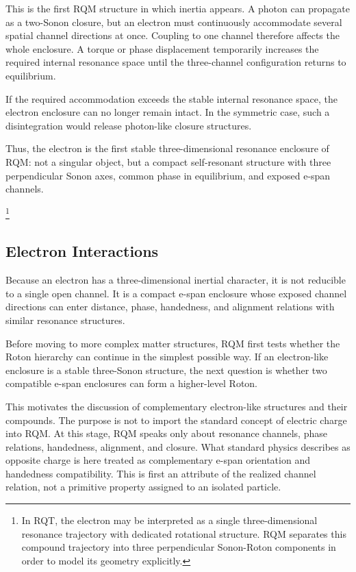 \documentclass[11pt,a4paper]{article}
\begin{document}
This is the first RQM structure in which inertia appears. A photon can propagate as a two-Sonon closure, but an electron must continuously accommodate several spatial channel directions at once. Coupling to one channel therefore affects the whole enclosure. A torque or phase displacement temporarily increases the required internal resonance space until the three-channel configuration returns to equilibrium.

If the required accommodation exceeds the stable internal resonance space, the electron enclosure can no longer remain intact. In the symmetric case, such a disintegration would release photon-like closure structures.

Thus, the electron is the first stable three-dimensional resonance enclosure of RQM: not a singular object, but a compact self-resonant structure with three perpendicular Sonon axes, common phase in equilibrium, and exposed e-span channels.

\footnote{In RQT, the electron may be interpreted as a single three-dimensional resonance trajectory with dedicated rotational structure. RQM separates this compound trajectory into three perpendicular Sonon-Roton components in order to model its geometry explicitly.}




\subsection{Electron Interactions}

Because an electron has a three-dimensional inertial character, it is not reducible to a single open channel. It is a compact e-span enclosure whose exposed channel directions can enter distance, phase, handedness, and alignment relations with similar resonance structures.

Before moving to more complex matter structures, RQM first tests whether the Roton hierarchy can continue in the simplest possible way. If an electron-like enclosure is a stable three-Sonon structure, the next question is whether two compatible e-span enclosures can form a higher-level Roton.

This motivates the discussion of complementary electron-like structures and their compounds. The purpose is not to import the standard concept of electric charge into RQM. At this stage, RQM speaks only about resonance channels, phase relations, handedness, alignment, and closure. What standard physics describes as opposite charge is here treated as complementary e-span orientation and handedness compatibility. This is first an attribute of the realized channel relation, not a primitive property assigned to an isolated particle.
\end{document}
